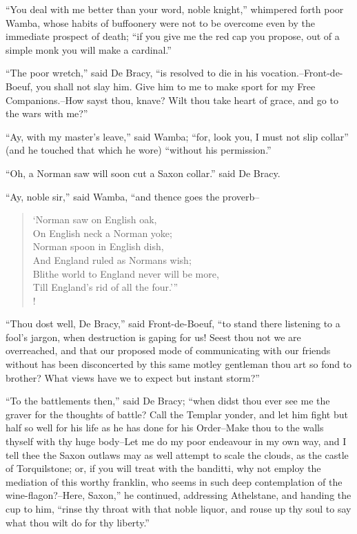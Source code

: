 ``You deal with me better than your word, noble knight,'' whimpered
forth poor Wamba, whose habits of buffoonery were not to be overcome
even by the immediate prospect of death; ``if you give me the red cap
you propose, out of a simple monk you will make a cardinal.''

``The poor wretch,'' said De Bracy, ``is resolved to die in his
vocation.--Front-de-Boeuf, you shall not slay him. Give him to me to
make sport for my Free Companions.--How sayst thou, knave? Wilt thou
take heart of grace, and go to the wars with me?''

``Ay, with my master's leave,'' said Wamba; ``for, look you, I must not
slip collar'' (and he touched that which he wore) ``without his
permission.''

``Oh, a Norman saw will soon cut a Saxon collar.'' said De Bracy.

``Ay, noble sir,'' said Wamba, ``and thence goes the proverb--

\begin{verse}
`Norman saw on English oak,\\
On English neck a Norman yoke;\\
Norman spoon in English dish,\\
And England ruled as Normans wish;\\
Blithe world to England never will be more,\\
Till England's rid of all the four.'''\\!
\end{verse}

``Thou dost well, De Bracy,'' said Front-de-Boeuf, ``to stand there
listening to a fool's jargon, when destruction is gaping for us! Seest
thou not we are overreached, and that our proposed mode of communicating
with our friends without has been disconcerted by this same motley
gentleman thou art so fond to brother? What views have we to expect but
instant storm?''

``To the battlements then,'' said De Bracy; ``when didst thou ever see
me the graver for the thoughts of battle? Call the Templar yonder, and
let him fight but half so well for his life as he has done for his
Order--Make thou to the walls thyself with thy huge body--Let me do my
poor endeavour in my own way, and I tell thee the Saxon outlaws may as
well attempt to scale the clouds, as the castle of Torquilstone; or, if
you will treat with the banditti, why not employ the mediation of this
worthy franklin, who seems in such deep contemplation of the
wine-flagon?--Here, Saxon,'' he continued, addressing Athelstane, and
handing the cup to him, ``rinse thy throat with that noble liquor, and
rouse up thy soul to say what thou wilt do for thy liberty.''

